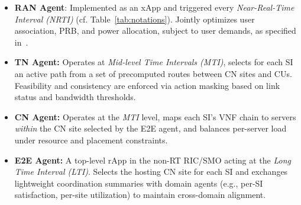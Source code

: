 \documentclass[12pt,lettersize,journal,onecolumn]{IEEEtran}
\begin{document}
\begin{itemize}[leftmargin=1.1em,labelsep=0.3em]
\item \textbf{RAN Agent}: Implemented as an xApp and triggered every \textit{Near-Real-Time Interval (NRTI)} (cf. Table~\ref{tab:notations}). Jointly optimizes user association, PRB, and power allocation, subject to user demands, as specified in~\cite{camad24ebrahimi}. %

\item \textbf{TN Agent:} Operates at \textit{Mid-level Time Intervals (MTI)}, selects for each SI an active path from a set of precomputed routes between CN sites and CUs. Feasibility and consistency are enforced via action masking based on link status and bandwidth thresholds. %

\item \textbf{CN Agent:} Operates at the \textit{MTI} level, maps each SI's VNF chain to servers \emph{within} the CN site selected by the E2E agent, and balances per-server load under resource and placement constraints. 

\item \textbf{E2E Agent:} A top-level rApp in the non-RT RIC/SMO acting at the \textit{Long Time Interval (LTI)}. Selects the hosting CN site for each SI and exchanges lightweight coordination summaries with domain agents (e.g., per-SI satisfaction, per-site utilization) to maintain cross-domain alignment.
\end{itemize}
\end{document}
